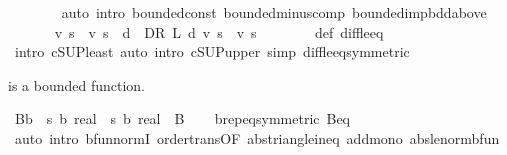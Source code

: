\begin{isabellebody}
\ \ \ \ \ \ \isamarkupfalse%
\ {\isacharparenleft}{\kern0pt}auto\ intro{\isacharbang}{\kern0pt}{\isacharcolon}{\kern0pt}\ bounded{\isacharunderscore}{\kern0pt}const\ bounded{\isacharunderscore}{\kern0pt}minus{\isacharunderscore}{\kern0pt}comp\ bounded{\isacharunderscore}{\kern0pt}imp{\isacharunderscore}{\kern0pt}bdd{\isacharunderscore}{\kern0pt}above{\isacharparenright}{\kern0pt}\isanewline
\ \ \ \ \isamarkupfalse%
\ {\isachardoublequoteopen}{\isasymL}\ v\ s\ {\isacharminus}{\kern0pt}\ v\ s\ {\isasymle}\ {\isacharparenleft}{\kern0pt}{\isasymSqunion}d\ {\isasymin}\ D\isactrlsub R{\isachardot}{\kern0pt}\ L\ d\ v\ s\ {\isacharminus}{\kern0pt}\ v\ s{\isacharparenright}{\kern0pt}{\isachardoublequoteclose}\isanewline
\ \ \ \ \ \ \isamarkupfalse%
\ {\isasymL}{\isacharunderscore}{\kern0pt}def\ diff{\isacharunderscore}{\kern0pt}le{\isacharunderscore}{\kern0pt}eq\isanewline
\ \ \ \ \ \ \isamarkupfalse%
\ {\isacharparenleft}{\kern0pt}intro\ cSUP{\isacharunderscore}{\kern0pt}least{\isacharparenright}{\kern0pt}\ {\isacharparenleft}{\kern0pt}auto\ intro{\isacharcolon}{\kern0pt}\ cSUP{\isacharunderscore}{\kern0pt}upper{}\ simp{\isacharcolon}{\kern0pt}\ diff{\isacharunderscore}{\kern0pt}le{\isacharunderscore}{\kern0pt}eq{\isacharbrackleft}{\kern0pt}symmetric{\isacharbrackright}{\kern0pt}{\isacharparenright}{\kern0pt}\isanewline
\ \ \isamarkupfalse%
\isanewline
{}\isamarkupfalse%
%
\endisatagproof
{\isafoldproof}%
%
\isadelimproof
%
\endisadelimproof
%
\begin{isamarkuptext}%
 is a bounded function.%
\end{isamarkuptext}\isamarkuptrue%
\isamarkupfalse%
\ B\isactrlsub b\ {\isacharcolon}{\kern0pt}{\isacharcolon}{\kern0pt}\ {\isachardoublequoteopen}{\isacharparenleft}{\kern0pt}{\isacharprime}{\kern0pt}s\ {\isasymRightarrow}\isactrlsub b\ real{\isacharparenright}{\kern0pt}\ {\isasymRightarrow}\ {\isacharprime}{\kern0pt}s\ {\isasymRightarrow}\isactrlsub b\ real{\isachardoublequoteclose}\ \ {\isachardoublequoteopen}B{\isachardoublequoteclose}\isanewline
%
\isadelimproof
\ \ %
\endisadelimproof
%
\isatagproof
{}\isamarkupfalse%
\ {\isasymL}\isactrlsub b{\isachardot}{\kern0pt}rep{\isacharunderscore}{\kern0pt}eq{\isacharbrackleft}{\kern0pt}symmetric{\isacharbrackright}{\kern0pt}\ B{\isacharunderscore}{\kern0pt}eq{\isacharunderscore}{\kern0pt}{\isasymL}\isanewline
\ \ \isamarkupfalse%
\ {\isacharparenleft}{\kern0pt}auto\ intro{\isacharbang}{\kern0pt}{\isacharcolon}{\kern0pt}\ bfun{\isacharunderscore}{\kern0pt}normI\ order{\isachardot}{\kern0pt}trans{\isacharbrackleft}{\kern0pt}OF\ abs{\isacharunderscore}{\kern0pt}triangle{\isacharunderscore}{\kern0pt}ineq{}{\isacharbrackright}{\kern0pt}\ add{\isacharunderscore}{\kern0pt}mono\ abs{\isacharunderscore}{\kern0pt}le{\isacharunderscore}{\kern0pt}norm{\isacharunderscore}{\kern0pt}bfun{\isacharparenright}{\kern0pt}%

\end{isabellebody}
